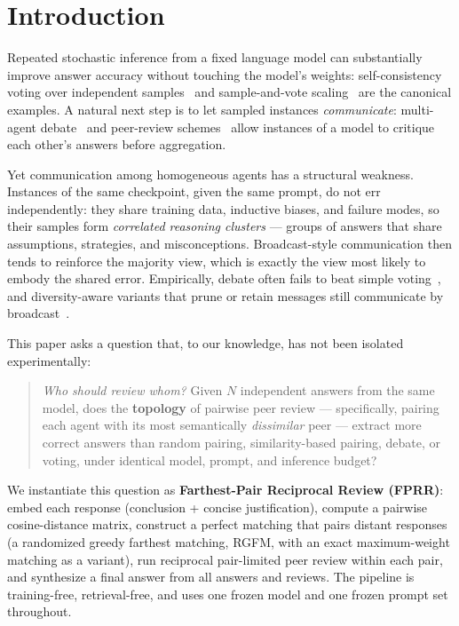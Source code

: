 \documentclass[11pt]{article}
\begin{document}
\section{Introduction}
\label{sec:intro}

Repeated stochastic inference from a fixed language model can substantially improve answer accuracy without touching the model's weights: self-consistency voting over independent samples~\cite{wang2022selfconsistency} and sample-and-vote scaling~\cite{li2024moreagents} are the canonical examples. A natural next step is to let sampled instances \emph{communicate}: multi-agent debate~\cite{du2023multiagent} and peer-review schemes~\cite{xu2023peerreview} allow instances of a model to critique each other's answers before aggregation.

Yet communication among homogeneous agents has a structural weakness. Instances of the same checkpoint, given the same prompt, do not err independently: they share training data, inductive biases, and failure modes, so their samples form \emph{correlated reasoning clusters} — groups of answers that share assumptions, strategies, and misconceptions. Broadcast-style communication then tends to reinforce the majority view, which is exactly the view most likely to embody the shared error. Empirically, debate often fails to beat simple voting~\cite{yang2025revisiting,choi2025debateorvote}, and diversity-aware variants that prune or retain messages still communicate by broadcast~\cite{estornell2024multillm,nguyen2026dars}.

This paper asks a question that, to our knowledge, has not been isolated experimentally:

\begin{quote}
\emph{Who should review whom?} Given $N$ independent answers from the same model, does the \textbf{topology} of pairwise peer review — specifically, pairing each agent with its most semantically \emph{dissimilar} peer — extract more correct answers than random pairing, similarity-based pairing, debate, or voting, under identical model, prompt, and inference budget?
\end{quote}

We instantiate this question as \textbf{Farthest-Pair Reciprocal Review (FPRR)}: embed each response (conclusion + concise justification), compute a pairwise cosine-distance matrix, construct a perfect matching that pairs distant responses (a randomized greedy farthest matching, RGFM, with an exact maximum-weight matching as a variant), run reciprocal pair-limited peer review within each pair, and synthesize a final answer from all answers and reviews. The pipeline is training-free, retrieval-free, and uses one frozen model and one frozen prompt set throughout.
\end{document}
